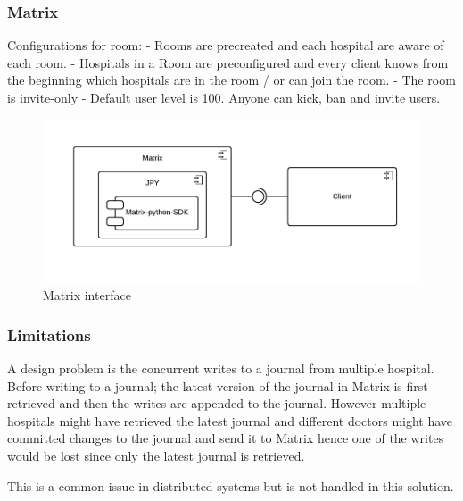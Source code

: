\subsubsection{Matrix}






Configurations for room:
- Rooms are precreated and each hospital are aware of each room. 
- Hospitals in a Room are preconfigured and every client knows from the beginning which hospitals are in the room / or can join the room.
- The room is invite-only
- Default user level is 100. Anyone can kick, ban and invite users. 


\begin{figure}[H] 
	\hspace*{-1cm}
	\centering
	\includegraphics[width=14cm]{figures/matrix_component.png}
	\caption{Matrix interface}
	\label{fig:matrix_component}
\end{figure}



\subsubsection{Limitations}


A design problem is the concurrent writes to a journal from multiple hospital. Before writing to a journal; the latest version of the journal in Matrix is first retrieved and then the writes are appended to the journal. However multiple hospitals might have retrieved the latest journal and different doctors might have committed changes to the journal and send it to Matrix hence one of the writes would be lost since only the latest journal is retrieved.

This is a common issue in distributed systems but is not handled in this solution. 





